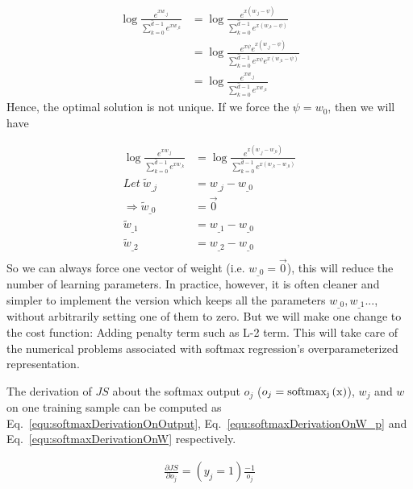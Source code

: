 \documentclass[runningheads,openany]{xhlPaper}
\begin{document}
\begin{displaymath}
\begin{aligned}
\log \frac{{{e^{x{w_{\_j}}}}}}{{\sum\limits_{k = 0}^{\hat d - 1} {{e^{x{w_{\_k}}}}} }}&=\log \frac{{{e^{x\left ( {w_{\_j}-\psi} \right )}}}}{{\sum\limits_{k = 0}^{\hat d - 1} {{e^{x\left ( {w_{\_k}-\psi} \right )}}} }}\\
&=\log \frac{{{e^{x\psi}e^{x\left ( {w_{\_j}-\psi} \right )}}}}{{\sum\limits_{k = 0}^{\hat d - 1} {{e^{x\psi}e^{x\left ( {w_{\_k}-\psi} \right )}}} }}\\
&=\log \frac{{{e^{x{w_{\_j}}}}}}{{\sum\limits_{k = 0}^{\hat d - 1} {{e^{x{w_{\_k}}}}} }}
\end{aligned}
\end{displaymath}
Hence, the optimal solution is not unique.
If we force the $\psi = w_0$, then we will have 

\begin{displaymath}
\begin{aligned}
\log \frac{{{e^{x{w_{\_j}}}}}}{{\sum\limits_{k = 0}^{\hat d - 1} {{e^{x{w_{\_k}}}}} }}&=\log \frac{{{e^{x\left ( {w_{\_j}-w_{\_0}} \right )}}}}{{\sum\limits_{k = 0}^{\hat d - 1} {{e^{x\left ( {w_{\_k}-w_{\_0}} \right )}}} }}\\
Let\ \tilde{w}_{\_j} &= w_{\_j} - w_{\_0}\\
\Rightarrow \tilde{w}_{\_0} &= \vec{0}\\
\tilde{w}_{\_1} &= w_{\_1} - w_{\_0}\\
\tilde{w}_{\_2} &= w_{\_2} - w_{\_0}\\
\end{aligned}
\end{displaymath}
So we can always force one vector of weight (i.e. $w_{\_0} = \vec{0}$), this will reduce the number of learning parameters. 
In practice, however, it is often cleaner and simpler to implement the version which keeps all the parameters $w_{\_0}, w_{\_1}...$, without arbitrarily setting one of them to zero. But we will make one change to the cost function: Adding penalty term such as L-2 term. This will take care of the numerical problems associated with softmax regression's overparameterized representation. 

The derivation of $JS$ about the softmax output $o_j$ ($o_j = \rm{softmax}_j\left(x\right)$), $w_j$ and $w$ on one training sample can be computed as Eq.~\ref{equ:softmaxDerivationOnOutput}, Eq.~\ref{equ:softmaxDerivationOnW_p} and Eq.~\ref{equ:softmaxDerivationOnW} respectively.

\begin{equation}
\label{equ:softmaxDerivationOnOutput}
\begin{aligned}
\frac{\partial JS}{\partial o_j}=\left ( y_j = 1 \right )\frac{-1}{o_j}
\end{aligned}
\end{equation}
\end{document}
